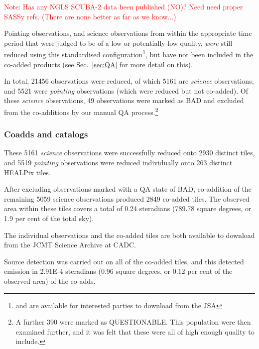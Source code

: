 \documentclass[twocolumn]{aastex6}
\newcommand{\sref}[1]{Sec.~\ref{#1}}
\newcommand{\note}[1]{\textcolor{red}{Note: #1}}
\newcommand{\status}[1]{\textsf{#1}}
\begin{document}
\note{Has any NGLS SCUBA-2 data been published (NO)? Need need proper
  SASSy refs. (There are none better as far as we know...)}

Pointing observations, and science observations from within the
appropriate time period that were judged to be of a low or
potentially-low quality, \emph{were} still reduced using this
standardised configuration\footnote{and are available for interested
  parties to download from the JSA}, but have not been included in the
co-added products (see \sref{sec:QA} for more detail on this).

In total, 21456 observations were reduced, of which 5161 are
\emph{science} observations, and 5521 were \emph{pointing}
observations (which were reduced but not co-added).  Of these
\emph{science} observations, 49 observations were marked as
\status{BAD} and excluded from the co-additions by our manual QA
process.\footnote{A further 390 were marked as
  \status{QUESTIONABLE}. This population were then examined further,
  and it was felt that these were all of high enough quality to
  include.}

\subsubsection{Coadds and catalogs}
These 5161 \emph{science} observations were successfully reduced onto
2930 distinct tiles, and 5519 \emph{pointing} observations were
reduced individually onto 263 distinct HEALPix tiles.

After excluding observations marked with a QA state of \status{BAD},
co-addition of the remaining 5059 science observations produced 2849
co-added tiles. The observed area within these tiles covers a total of
0.24 steradians (789.78 square degrees, or 1.9 per cent of the total
sky).

The individual observations and the co-added tiles are both available
to download from the JCMT Science Archive at CADC.

Source detection was carried out on all of the co-added tiles, and this
detected emission in 2.91E-4 steradians (0.96 square degrees, or 0.12
per cent of the observed area) of the co-adds.
\end{document}
